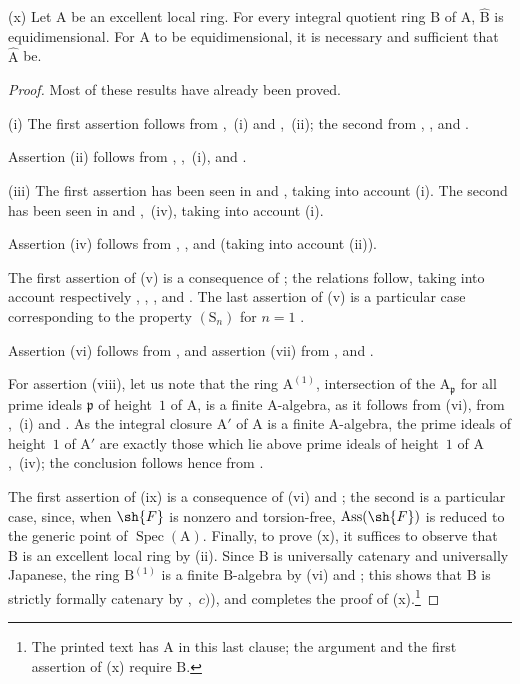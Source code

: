 \begin{scholium}[7.8.3]

(x) Let $\mathrm{A}$ be an excellent local ring. For every integral quotient ring $\mathrm{B}$ of $\mathrm{A}$, $\widehat{\mathrm{B}}$ is equidimensional. For $\mathrm{A}$ to be equidimensional, it is necessary and sufficient that $\widehat{\mathrm{A}}$ be.
\end{scholium}

\begin{proof}
Most of these results have already been proved.

(i) The first assertion follows from ,~(i) and ,~(ii); the second from , ,  and .

Assertion (ii) follows from , ,~(i),  and .

(iii) The first assertion has been seen in  and , taking into account (i). The second has been seen in  and ,~(iv), taking into account (i).

Assertion (iv) follows from , ,  and  (taking into account (ii)).

The first assertion of (v) is a consequence of ; the relations  follow, taking into account respectively , , ,  and . The last assertion of (v) is a particular case corresponding to the property $(\mathrm{S}_n)$ for $n=1$ .

Assertion (vi) follows from , and assertion (vii) from ,  and .

For assertion (viii), let us note that the ring $\mathrm{A}^{(1)}$, intersection of the $\mathrm{A}_\mathfrak{p}$ for all prime ideals $\mathfrak{p}$ of height~$1$ of $\mathrm{A}$, is a finite $\mathrm{A}$-algebra, as it follows from (vi), from ,~(i) and . As the integral closure $\mathrm{A}'$ of $\mathrm{A}$ is a finite $\mathrm{A}$-algebra, the prime ideals of height~$1$ of $\mathrm{A}'$ are exactly those which lie above prime ideals of height~$1$ of $\mathrm{A}$ ,~(iv); the conclusion follows hence from .

The first assertion of (ix) is a consequence of (vi) and ; the second is a particular case, since, when $\sh{F}$ is nonzero and torsion-free, $\operatorname{Ass}(\sh{F})$ is reduced to the generic point of $\operatorname{Spec}(\mathrm{A})$. Finally, to prove (x), it suffices to observe that $\mathrm{B}$ is an excellent local ring by (ii). Since $\mathrm{B}$ is universally catenary and universally Japanese, the ring $\mathrm{B}^{(1)}$ is a finite $\mathrm{B}$-algebra by (vi) and ; this shows that $\mathrm{B}$ is strictly formally catenary by ,~$c)$), and completes the proof of (x).\footnote{The printed text has $\mathrm{A}$ in this last clause; the argument and the first assertion of (x) require $\mathrm{B}$.}
\end{proof}

